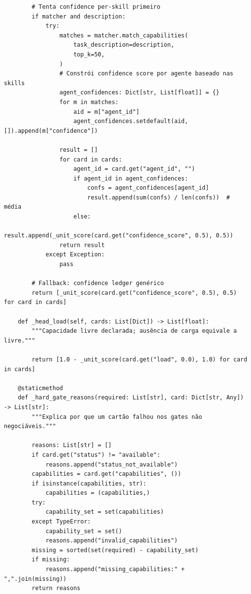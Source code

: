 \documentclass[12pt,openany,oneside,a4paper,brazil,chapter=TITLE]{abntex2}
\begin{document}
\begin{lstlisting}
        # Tenta confidence per-skill primeiro
        if matcher and description:
            try:
                matches = matcher.match_capabilities(
                    task_description=description,
                    top_k=50,
                )
                # Constrói confidence score por agente baseado nas skills
                agent_confidences: Dict[str, List[float]] = {}
                for m in matches:
                    aid = m["agent_id"]
                    agent_confidences.setdefault(aid, []).append(m["confidence"])

                result = []
                for card in cards:
                    agent_id = card.get("agent_id", "")
                    if agent_id in agent_confidences:
                        confs = agent_confidences[agent_id]
                        result.append(sum(confs) / len(confs))  # média
                    else:
                        result.append(_unit_score(card.get("confidence_score", 0.5), 0.5))
                return result
            except Exception:
                pass

        # Fallback: confidence ledger genérico
        return [_unit_score(card.get("confidence_score", 0.5), 0.5) for card in cards]

    def _head_load(self, cards: List[Dict]) -> List[float]:
        """Capacidade livre declarada; ausência de carga equivale a livre."""

        return [1.0 - _unit_score(card.get("load", 0.0), 1.0) for card in cards]

    @staticmethod
    def _hard_gate_reasons(required: List[str], card: Dict[str, Any]) -> List[str]:
        """Explica por que um cartão falhou nos gates não negociáveis."""

        reasons: List[str] = []
        if card.get("status") != "available":
            reasons.append("status_not_available")
        capabilities = card.get("capabilities", ())
        if isinstance(capabilities, str):
            capabilities = (capabilities,)
        try:
            capability_set = set(capabilities)
        except TypeError:
            capability_set = set()
            reasons.append("invalid_capabilities")
        missing = sorted(set(required) - capability_set)
        if missing:
            reasons.append("missing_capabilities:" + ",".join(missing))
        return reasons


\end{lstlisting}
\end{document}
